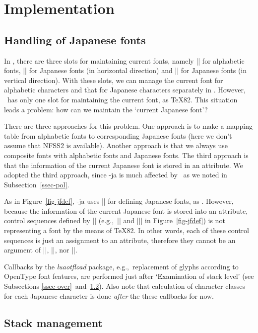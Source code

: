 \documentclass{ajt}
\begin{document}
\section{Implementation}
\label{sec:implementation}
\subsection{Handling of Japanese fonts}
In \pTeX, there are three slots for maintaining current fonts, namely
|\font| for alphabetic fonts, |\jfont| for Japanese fonts (in horizontal
direction) and |\tfont| for Japanese fonts (in vertical direction). With
these slots, we can manage the current font for alphabetic characters
and that for Japanese characters separately in \pTeX.  However, \LuaTeX\
has only one slot for maintaining the current font, as \TeX82.  This
situation leads a problem: how can we maintain the `current Japanese
font'?

There are three approaches for this problem. One approach is to make a
mapping table from alphabetic fonts to corresponding Japanese fonts
(here we don't assume that NFSS2 is available).  Another approach is
that we always use composite fonts with alphabetic fonts and Japanese
fonts. The third approach is that the information of the current
Japanese font is stored in an attribute. We adopted the third approach,
since \LuaTeX-ja is much affected by \pTeX\ as we noted in
Subsection~\ref{ssec-pol}.

As in Figure~\ref{fig-jfdef}, \LuaTeX-ja uses |\jfont| for defining
Japanese fonts, as \pTeX.  However, because the information of the current
Japanese font is stored into an attribute, control sequences defined by
|\jfont| (e.g.,~|\foo| and |\bar| in Figure~\ref{fig-jfdef}) is
not representing a font by the means of \TeX82. In other words, each of
these control sequences is just an assignment to an attribute, therefore
they cannot be an argument of |\the|, |\fontname|, nor |\textfont|.


Callbacks by the \emph{luaotfload} package, e.g.,~replacement of glyphs
according to OpenType font features, are performed just after `Examination of
stack level' (see Subsections
\ref{ssec-over}~and~\ref{ssec-stack}). Also note that calculation of
character classes for each Japanese character is done \emph{after} the
these callbacks for now. 

\subsection{Stack management}
\label{ssec-stack}
\end{document}
